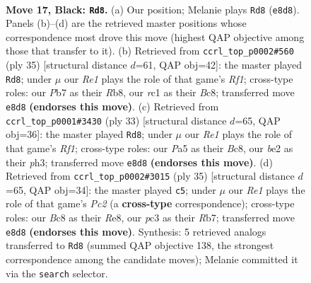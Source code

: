 \documentclass[11pt]{article}
\begin{document}
\clearpage

\begin{figure}[p]\centering
\begin{subfigure}{0.46\textwidth}\centering
\resizebox{\linewidth}{!}{%
\newchessgame
\chessboard[
  setfen={r1b1r1k1/1p2qppp/2n1p3/p1Pp4/3P4/P1P2N1P/3QBPP1/R1R3K1 b - - 1 17},
  showmover=false,
  pgfstyle=straightmove, color=movearrow, markmove={e8-d8}
]}
\caption{}
\end{subfigure}\hfill
\begin{subfigure}{0.46\textwidth}\centering
\resizebox{\linewidth}{!}{%
\newchessgame
\chessboard[
  setfen={1rb2rk1/1p3pp1/3ppq1p/pN2n3/2P5/2P1P1P1/P3QPBP/RR4K1 b - - 1 18},
  showmover=false,
  pgfstyle=straightmove, color=movearrow, markmove={f8-d8}
]}
\caption{}
\end{subfigure}
\\[4pt]
\begin{subfigure}{0.46\textwidth}\centering
\resizebox{\linewidth}{!}{%
\newchessgame
\chessboard[
  setfen={r1b2rk1/1pq2ppp/3pn3/p3p3/2P1P3/PP2QN1P/4BPP1/R2R2K1 b - - 4 17},
  showmover=false,
  pgfstyle=straightmove, color=movearrow, markmove={f8-d8}
]}
\caption{}
\end{subfigure}\hfill
\begin{subfigure}{0.46\textwidth}\centering
\resizebox{\linewidth}{!}{%
\newchessgame
\chessboard[
  setfen={4r1k1/1rpqbppp/3pn3/1p2p3/4P2P/2PPBN2/1P3PP1/R2QR1K1 b - - 1 18},
  showmover=false,
  pgfstyle=straightmove, color=movearrow, markmove={c7-c5}
]}
\caption{}
\end{subfigure}
\caption{\textbf{Move 17, Black: \texttt{Rd8}.} (a) Our position; Melanie plays \texttt{Rd8} (\texttt{e8d8}). Panels (b)--(d) are the retrieved master positions whose correspondence most drove this move (highest QAP objective among those that transfer to it). (b) Retrieved from \texttt{ccrl\_top\_p0002\#560} (ply 35) [structural distance $d$=61, QAP obj=42]: the master played \texttt{Rd8}; under $\mu$ our \emph{Re1} plays the role of that game's \emph{Rf1}; cross-type roles: our \emph{P}b7 as their \emph{R}b8, our \emph{r}c1 as their \emph{B}c8; transferred move \texttt{e8d8} \textbf{(endorses this move)}. (c) Retrieved from \texttt{ccrl\_top\_p0001\#3430} (ply 33) [structural distance $d$=65, QAP obj=36]: the master played \texttt{Rd8}; under $\mu$ our \emph{Re1} plays the role of that game's \emph{Rf1}; cross-type roles: our \emph{P}a5 as their \emph{B}c8, our \emph{b}e2 as their \emph{p}h3; transferred move \texttt{e8d8} \textbf{(endorses this move)}. (d) Retrieved from \texttt{ccrl\_top\_p0002\#3015} (ply 35) [structural distance $d$=65, QAP obj=34]: the master played \texttt{c5}; under $\mu$ our \emph{Re1} plays the role of that game's \emph{Pc2} (a \textbf{cross-type} correspondence); cross-type roles: our \emph{B}c8 as their \emph{R}e8, our \emph{p}c3 as their \emph{R}b7; transferred move \texttt{e8d8} \textbf{(endorses this move)}. Synthesis: 5 retrieved analogs transferred to \texttt{Rd8} (summed QAP objective 138, the strongest correspondence among the candidate moves); Melanie committed it via the \texttt{search} selector.}
\label{fig:thought-m33}
\end{figure}
\end{document}
